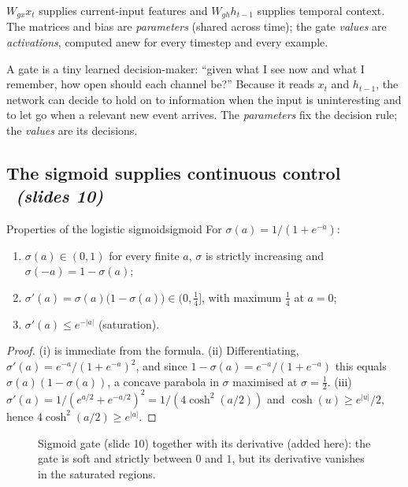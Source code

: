 \documentclass[11pt,a4paper]{article}
\newcommand{\sltag}[1]{\texorpdfstring{\ \emph{(slides #1)}}{ (slides #1)}}
\begin{document}
$W_{gx}x_t$ supplies current-input features and $W_{gh}h_{t-1}$ supplies temporal context. The matrices and bias are \emph{parameters} (shared across time); the gate \emph{values} are \emph{activations}, computed anew for every timestep and every example.

\begin{intuition}
A gate is a tiny learned decision-maker: ``given what I see now and what I remember, how open should each channel be?'' Because it reads $x_t$ and $h_{t-1}$, the network can decide to hold on to information when the input is uninteresting and to let go when a relevant new event arrives. The \emph{parameters} fix the decision rule; the \emph{values} are its decisions.
\end{intuition}

\subsection{The sigmoid supplies continuous control \sltag{10}}

\begin{proposition}{Properties of the logistic sigmoid}{sigmoid}
For $\sigma(a)=1/(1+e^{-a})$:
\begin{enumerate}[label=(\roman*)]
 \item $\sigma(a)\in(0,1)$ for every finite $a$, $\sigma$ is strictly increasing and $\sigma(-a)=1-\sigma(a)$;
 \item $\sigma'(a)=\sigma(a)\big(1-\sigma(a)\big)\in(0,\tfrac14]$, with maximum $\tfrac14$ at $a=0$;
 \item $\sigma'(a)\le e^{-|a|}$ (saturation).
\end{enumerate}
\end{proposition}
\begin{proof}
(i) is immediate from the formula. (ii) Differentiating, $\sigma'(a)=e^{-a}/(1+e^{-a})^2$, and since $1-\sigma(a)=e^{-a}/(1+e^{-a})$ this equals $\sigma(a)(1-\sigma(a))$, a concave parabola in $\sigma$ maximised at $\sigma=\tfrac12$. (iii) $\sigma'(a)=1/(e^{a/2}+e^{-a/2})^2=1/(4\cosh^2(a/2))$ and $\cosh(u)\ge e^{|u|}/2$, hence $4\cosh^2(a/2)\ge e^{|a|}$.
\end{proof}

\begin{figure}[H]\centering
{}
\caption{Sigmoid gate (slide 10) together with its derivative (added here): the gate is soft and strictly between $0$ and $1$, but its derivative vanishes in the saturated regions.}
\end{figure}
\end{document}
